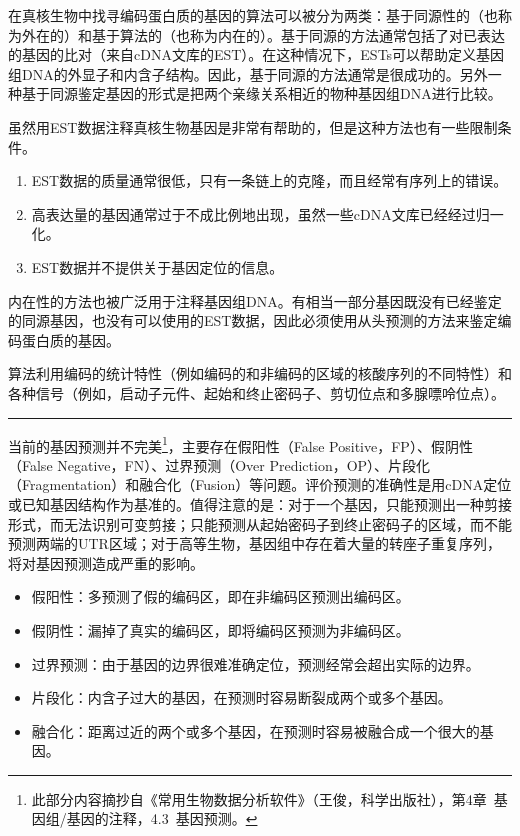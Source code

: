 \documentclass[11pt,a4paper,twoside]{book}
\begin{document}
{在真核生物中找寻编码蛋白质的基因的算法可以被分为两类：基于同源性的（也称为外在的）和基于算法的（也称为内在的）。基于同源的方法通常包括了对已表达的基因的比对（来自cDNA文库的EST）。在这种情况下，ESTs可以帮助定义基因组DNA的外显子和内含子结构。因此，基于同源的方法通常是很成功的。另外一种基于同源鉴定基因的形式是把两个亲缘关系相近的物种基因组DNA进行比较。

虽然用EST数据注释真核生物基因是非常有帮助的，但是这种方法也有一些限制条件。
\begin{enumerate}
  \item EST数据的质量通常很低，只有一条链上的克隆，而且经常有序列上的错误。
  \item 高表达量的基因通常过于不成比例地出现，虽然一些cDNA文库已经经过归一化。
  \item EST数据并不提供关于基因定位的信息。
\end{enumerate}

内在性的方法也被广泛用于注释基因组DNA。有相当一部分基因既没有已经鉴定的同源基因，也没有可以使用的EST数据，因此必须使用从头预测的方法来鉴定编码蛋白质的基因。

算法利用编码的统计特性（例如编码的和非编码的区域的核酸序列的不同特性）和各种信号（例如，启动子元件、起始和终止密码子、剪切位点和多腺嘌呤位点）。
}

\hrule height 3pt
\vspace{0.5cm}

当前的基因预测并不完美\footnote{此部分内容摘抄自《常用生物数据分析软件》（王俊，科学出版社），第4章\ 基因组/基因的注释，4.3\ 基因预测。}，主要存在假阳性（False Positive，FP）、假阴性（False Negative，FN）、过界预测（Over Prediction，OP）、片段化（Fragmentation）和融合化（Fusion）等问题。评价预测的准确性是用cDNA定位或已知基因结构作为基准的。值得注意的是：对于一个基因，只能预测出一种剪接形式，而无法识别可变剪接；只能预测从起始密码子到终止密码子的区域，而不能预测两端的UTR区域；对于高等生物，基因组中存在着大量的转座子重复序列，将对基因预测造成严重的影响。
\begin{itemize}
  \item 假阳性：多预测了假的编码区，即在非编码区预测出编码区。
  \item 假阴性：漏掉了真实的编码区，即将编码区预测为非编码区。
  \item 过界预测：由于基因的边界很难准确定位，预测经常会超出实际的边界。
  \item 片段化：内含子过大的基因，在预测时容易断裂成两个或多个基因。
  \item 融合化：距离过近的两个或多个基因，在预测时容易被融合成一个很大的基因。
\end{itemize}
\end{document}

